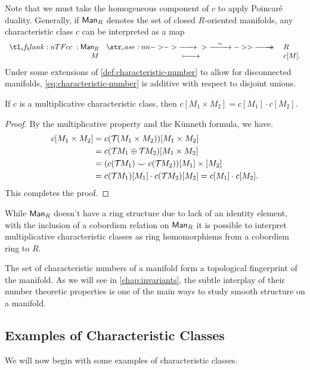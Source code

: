 Note that we must take the homogeneous component of $c$ to apply Poincar\'e duality. Generally, if $\mathsf{Man}_R$ denotes the set of closed $R$-oriented manifolds, any characteristic class $c$ can be interpreted as a map
\begin{equation}\label{eq:characteristic-number}
	\lkxfunc{c}{\Man_R}{R}{M}{c[M].}
\end{equation}
Under some extensions of \cref{def:characteristic-number} to allow for disconnected manifolds, \cref{eq:characteristic-number} is additive with respect to disjoint unions.
\begin{proposition}
	If $c$ is a multiplicative characteristic class, then $c[M_1\times M_2]=c[M_1]\cdot c[M_2]$.
\end{proposition}
\begin{proof}
	By the multiplicative property and the K\"unneth formula, we have.
	\[
		\begin{aligned}
			c[M_1\times M_2]
			 & = c({\mathcal{T}\hspace{-0.1em}} (M_1\times M_2))[M_1\times M_2]                      \\
			 & = c({\mathcal{T}\hspace{-0.1em}} M_1\oplus {\mathcal{T}\hspace{-0.1em}} M_2)[M_1\times M_2]                    \\
			 & = (c({\mathcal{T}\hspace{-0.1em}} M_1)\smile c({\mathcal{T}\hspace{-0.1em}} M_2))[M_1]\times [M_2]             \\
			 & = c({\mathcal{T}\hspace{-0.1em}} M_1)[M_1]\cdot c({\mathcal{T}\hspace{-0.1em}} M_2)[M_2] = c[M_1]\cdot c[M_2].
		\end{aligned}
	\]
	This completes the proof.
\end{proof}

\begin{remark} 
	While $\mathsf{Man}_R$ doesn't have a ring structure due to lack of an identity element, with the inclusion of a cobordism relation on $\mathsf{Man}_R$ it is possible to interpret multiplicative characteristic classes as ring homomorphisms from a cobordism ring to $R$.
\end{remark}

The set of characteristic numbers of a manifold form a topological fingerprint of the manifold. As we will see in \cref{chap:invariants}, the subtle interplay of their number theoretic properties is one of the main ways to study smooth structure on a manifold.

\subsection{Examples of Characteristic Classes}

We will now begin with some examples of characteristic classes.

